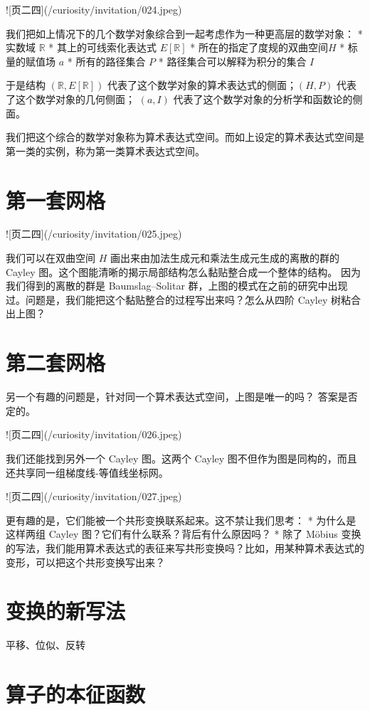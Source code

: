 \documentclass[a4paper,12pt]{book}
\numberwithin{problem}{section}
\numberwithin{definition}{section}
\numberwithin{lemma}{section}
\numberwithin{proposition}{section}
\numberwithin{theorem}{section}
\numberwithin{grammar}{section}
\numberwithin{program}{section}
\numberwithin{convention}{section}
\numberwithin{corollary}{section}
\begin{document}
![页二四](/curiosity/invitation/024.jpeg)

我们把如上情况下的几个数学对象综合到一起考虑作为一种更高层的数学对象：
* 实数域 $\mathbb{R}$
* 其上的可线索化表达式 $E[\mathbb{R}]$
* 所在的指定了度规的双曲空间$H$
* 标量的赋值场 $a$
* 所有的路径集合 $P$
* 路径集合可以解释为积分的集合 $I$

于是结构 $(\mathbb{R}, E[\mathbb{R}])$ 代表了这个数学对象的算术表达式的侧面；$(H, P)$ 代表了这个数学对象的几何侧面；
$(a, I)$ 代表了这个数学对象的分析学和函数论的侧面。

我们把这个综合的数学对象称为算术表达式空间。而如上设定的算术表达式空间是第一类的实例，称为第一类算术表达式空间。

\section{第一套网格}

![页二四](/curiosity/invitation/025.jpeg)

我们可以在双曲空间 $H$ 画出来由加法生成元和乘法生成元生成的离散的群的 Cayley 图。这个图能清晰的揭示局部结构怎么黏贴整合成一个整体的结构。
因为我们得到的离散的群是 Baumslag–Solitar 群，上图的模式在之前的研究中出现过。问题是，我们能把这个黏贴整合的过程写出来吗？怎么从四阶 Cayley 树粘合出上图？

\section{第二套网格}

另一个有趣的问题是，针对同一个算术表达式空间，上图是唯一的吗？ 答案是否定的。

![页二四](/curiosity/invitation/026.jpeg)

我们还能找到另外一个 Cayley 图。这两个 Cayley 图不但作为图是同构的，而且还共享同一组梯度线-等值线坐标网。

![页二四](/curiosity/invitation/027.jpeg)

更有趣的是，它们能被一个共形变换联系起来。这不禁让我们思考：
* 为什么是这样两组 Cayley 图？它们有什么联系？背后有什么原因吗？
* 除了 Möbius 变换的写法，我们能用算术表达式的表征来写共形变换吗？比如，用某种算术表达式的变形，可以把这个共形变换写出来？

\section{变换的新写法}

平移、位似、反转

\section{算子的本征函数}
\end{document}
